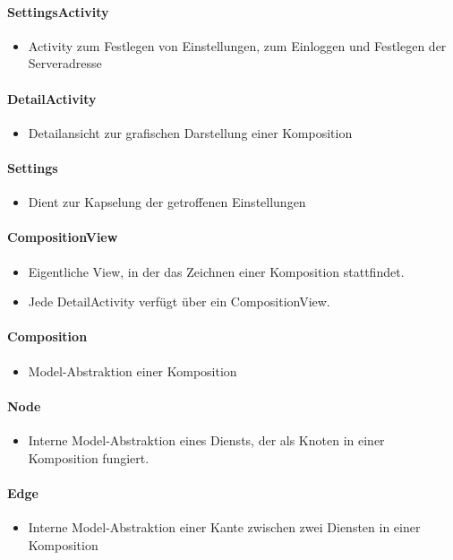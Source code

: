 \paragraph{SettingsActivity}
\begin{itemize} 
	\item Activity zum Festlegen von Einstellungen, zum Einloggen und Festlegen der Serveradresse 
\end{itemize} 
\paragraph{DetailActivity}
\begin{itemize}
	\item Detailansicht zur grafischen Darstellung einer Komposition 
\end{itemize}
\paragraph{Settings} 
\begin{itemize}		
	\item Dient zur Kapselung der getroffenen Einstellungen 
\end{itemize}
\paragraph{CompositionView}
\begin{itemize}
	\item Eigentliche View, in der das Zeichnen einer Komposition stattfindet. 
	\item Jede DetailActivity verfügt über ein CompositionView. 
\end{itemize}
\paragraph{Composition}
\begin{itemize}
	\item Model-Abstraktion einer Komposition 
\end{itemize}
\paragraph{Node}
\begin{itemize}
	\item Interne Model-Abstraktion eines Diensts, der als Knoten in einer Komposition fungiert. 
\end{itemize}
\paragraph{Edge} 
\begin{itemize}
	\item Interne Model-Abstraktion einer Kante zwischen zwei Diensten in einer Komposition 
\end{itemize}
